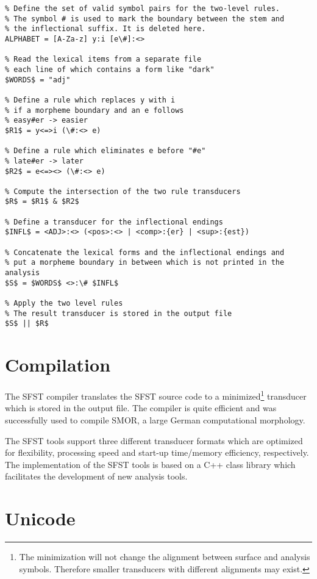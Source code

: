 \documentclass{article}
\begin{document}
\begin{verbatim}
% Define the set of valid symbol pairs for the two-level rules.
% The symbol # is used to mark the boundary between the stem and
% the inflectional suffix. It is deleted here.
ALPHABET = [A-Za-z] y:i [e\#]:<> 

% Read the lexical items from a separate file
% each line of which contains a form like "dark"
$WORDS$ = "adj"

% Define a rule which replaces y with i 
% if a morpheme boundary and an e follows
% easy#er -> easier
$R1$ = y<=>i (\#:<> e)

% Define a rule which eliminates e before "#e"
% late#er -> later
$R2$ = e<=><> (\#:<> e)

% Compute the intersection of the two rule transducers
$R$ = $R1$ & $R2$

% Define a transducer for the inflectional endings
$INFL$ = <ADJ>:<> (<pos>:<> | <comp>:{er} | <sup>:{est})

% Concatenate the lexical forms and the inflectional endings and
% put a morpheme boundary in between which is not printed in the analysis
$S$ = $WORDS$ <>:\# $INFL$

% Apply the two level rules
% The result transducer is stored in the output file
$S$ || $R$
\end{verbatim}



\section{Compilation}

The SFST compiler translates the SFST source code to a
minimized\footnote{The minimization will not change the alignment
  between surface and analysis symbols. Therefore smaller transducers
  with different alignments may exist.} transducer which is stored in
the output file. The compiler is quite efficient and was successfully
used to compile SMOR, a large German computational morphology.

The SFST tools support three different transducer formats which are
optimized for flexibility, processing speed and start-up time/memory
efficiency, respectively. The implementation of the SFST tools is
based on a C++ class library which facilitates the development of new
analysis tools. 


\section{Unicode}
\end{document}
